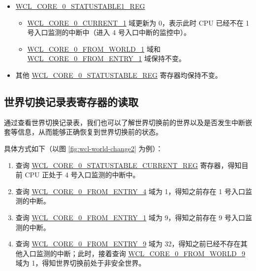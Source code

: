 \documentclass[main\_\_CN.tex]{subfiles}
\begin{document}
\begin{enumerate}
\begin{itemize}
\begin{itemize}
            \item \hyperref[fielddesc:WCLCORE0FROMWORLD0]{WCL\_CORE\_0\_FROM\_WORLD\_4} 域为 0，表示 CPU 在切换之前处于安全世界。
            \item \hyperref[fielddesc:WCLCORE0FROMENTRY0]{WCL\_CORE\_0\_FROM\_ENTRY\_4} 域为 1，表示切换之前处于 1 号入口监测的中断。
            \item \hyperref[fielddesc:WCLCORE0CURRENT0]{WCL\_CORE\_0\_CURRENT\_4} 域更新为 1，表示此时 CPU 正在 4 号入口监测的中断中。
        \end{itemize}
        \item \hyperref[regdesc:WCLCORE0STATUSTABLE0REG]{WCL\_CORE\_0\_STATUSTABLE1\_REG}
        \begin{itemize}
            \item \hyperref[fielddesc:WCLCORE0CURRENT0]{WCL\_CORE\_0\_CURRENT\_1} 域更新为 0，表示此时 CPU 已经不在 1 号入口监测的中断中（进入 4 号入口中断的监控中）。
            \item \hyperref[fielddesc:WCLCORE0FROMWORLD0]{WCL\_CORE\_0\_FROM\_WORLD\_1} 域和 \hyperref[fielddesc:WCLCORE0FROMENTRY0]{WCL\_CORE\_0\_FROM\_ENTRY\_1} 域保持不变。
        \end{itemize}
        \item 其他 \hyperref[regdesc:WCLCORE0STATUSTABLE0REG]{WCL\_CORE\_0\_STATUSTABLE\_REG} 寄存器均保持不变。
\end{itemize}
\end{enumerate}

\subsection{世界切换记录表寄存器的读取} \label{sec:wctrl-read-table}

通过查看世界切换记录表，我们也可以了解世界切换前的世界以及是否发生中断嵌套等信息，从而能够正确恢复到世界切换前的状态。

具体方式如下（以图 \ref{fig:wcl-world-change2} 为例）：
\begin{enumerate}
    \item 查询 \hyperref[regdesc:WCLCORE0STATUSTABLECURRENTREG]{WCL\_CORE\_0\_STATUSTABLE\_CURRENT\_REG} 寄存器，得知目前 CPU 正处于 4 号入口监测的中断中。
    \item 查询 \hyperref[fielddesc:WCLCORE0FROMENTRY0]{WCL\_CORE\_0\_FROM\_ENTRY\_4} 域为 1，得知之前存在 1 号入口监测的中断。
    \item 查询 \hyperref[fielddesc:WCLCORE0FROMENTRY0]{WCL\_CORE\_0\_FROM\_ENTRY\_1} 域为 9，得知之前存在 9 号入口监测的中断。
    \item 查询 \hyperref[fielddesc:WCLCORE0FROMENTRY0]{WCL\_CORE\_0\_FROM\_ENTRY\_9} 域为 32，得知之前已经不存在其他入口监测的中断；此时，接着查询 \hyperref[fielddesc:WCLCORE0FROMWORLD0]{WCL\_CORE\_0\_FROM\_WORLD\_9} 域为 1，得知世界切换前处于非安全世界。
\end{enumerate}
\end{document}

